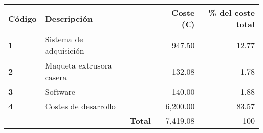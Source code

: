 \begin{center}
    \begin{tabular}{ | l || p{9cm}  l | r | r |}
    \hline
    \textbf{Código} & \multicolumn{1}{l}{\textbf{Descripción}} &  & \textbf{Coste (\euro)}  & \textbf{\% del coste total} \\ \hline \hline
    
    \textbf{1} & Sistema de adquisición &  & 947.50 & 12.77 \\ \hline
    
	\textbf{2} & Maqueta extrusora casera &  & 132.08& 1.78 \\ \hline

	\textbf{3} & Software &  & 140.00 & 1.88 \\ \hline 

    \textbf{4} & Costes de desarrollo &  & 6,200.00 & 83.57\\ \hline 
	
	\multicolumn{1}{r}{} & & \textbf{Total} & 7,419.08 & 100\\  \cline{4-5}
    	
	
\end{tabular}
\end{center}